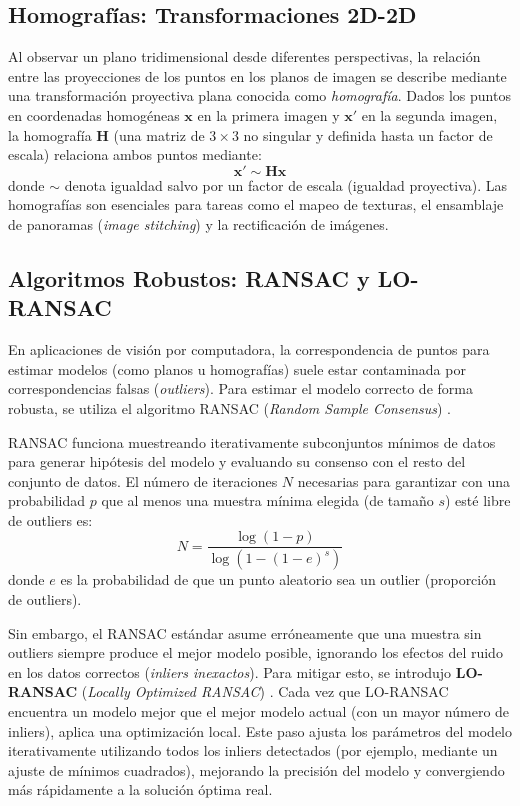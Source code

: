 \subsection{Homografías: Transformaciones 2D-2D}
Al observar un plano tridimensional desde diferentes perspectivas, la relación entre las proyecciones de los puntos en los planos de imagen se describe mediante una transformación proyectiva plana conocida como \textit{homografía}. Dados los puntos en coordenadas homogéneas $\mathbf{x}$ en la primera imagen y $\mathbf{x}'$ en la segunda imagen, la homografía $\mathbf{H}$ (una matriz de $3 \times 3$ no singular y definida hasta un factor de escala) relaciona ambos puntos mediante:
\begin{equation}
    \mathbf{x}' \sim \mathbf{H} \mathbf{x}
\end{equation}
donde $\sim$ denota igualdad salvo por un factor de escala (igualdad proyectiva). Las homografías son esenciales para tareas como el mapeo de texturas, el ensamblaje de panoramas (\textit{image stitching}) y la rectificación de imágenes.

\subsection{Algoritmos Robustos: RANSAC y LO-RANSAC}
En aplicaciones de visión por computadora, la correspondencia de puntos para estimar modelos (como planos u homografías) suele estar contaminada por correspondencias falsas (\textit{outliers}). Para estimar el modelo correcto de forma robusta, se utiliza el algoritmo RANSAC (\textit{Random Sample Consensus}) \cite{fischler1981ransac}.

RANSAC funciona muestreando iterativamente subconjuntos mínimos de datos para generar hipótesis del modelo y evaluando su consenso con el resto del conjunto de datos. El número de iteraciones $N$ necesarias para garantizar con una probabilidad $p$ que al menos una muestra mínima elegida (de tamaño $s$) esté libre de outliers es:
\begin{equation}
    N = \frac{\log(1 - p)}{\log(1 - (1 - e)^s)}
\end{equation}
donde $e$ es la probabilidad de que un punto aleatorio sea un outlier (proporción de outliers).

Sin embargo, el RANSAC estándar asume erróneamente que una muestra sin outliers siempre produce el mejor modelo posible, ignorando los efectos del ruido en los datos correctos (\textit{inliers inexactos}). Para mitigar esto, se introdujo \textbf{LO-RANSAC} (\textit{Locally Optimized RANSAC}) \cite{chum2003locally}. Cada vez que LO-RANSAC encuentra un modelo mejor que el mejor modelo actual (con un mayor número de inliers), aplica una optimización local. Este paso ajusta los parámetros del modelo iterativamente utilizando todos los inliers detectados (por ejemplo, mediante un ajuste de mínimos cuadrados), mejorando la precisión del modelo y convergiendo más rápidamente a la solución óptima real.

